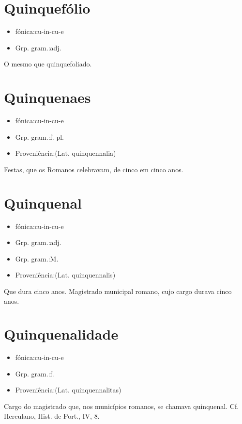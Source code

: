 \section{Quinquefólio}
\begin{itemize}
\item {fónica:cu-in-cu-e}
\end{itemize}
\begin{itemize}
\item {Grp. gram.:adj.}
\end{itemize}
O mesmo que \textunderscore quinquefoliado\textunderscore .
\section{Quinquenaes}
\begin{itemize}
\item {fónica:cu-in-cu-e}
\end{itemize}
\begin{itemize}
\item {Grp. gram.:f. pl.}
\end{itemize}
\begin{itemize}
\item {Proveniência:(Lat. \textunderscore quinquennalia\textunderscore )}
\end{itemize}
Festas, que os Romanos celebravam, de cinco em cinco anos.
\section{Quinquenal}
\begin{itemize}
\item {fónica:cu-in-cu-e}
\end{itemize}
\begin{itemize}
\item {Grp. gram.:adj.}
\end{itemize}
\begin{itemize}
\item {Grp. gram.:M.}
\end{itemize}
\begin{itemize}
\item {Proveniência:(Lat. \textunderscore quinquennalis\textunderscore )}
\end{itemize}
Que dura cinco anos.
Magistrado municipal romano, cujo cargo durava cinco anos.
\section{Quinquenalidade}
\begin{itemize}
\item {fónica:cu-in-cu-e}
\end{itemize}
\begin{itemize}
\item {Grp. gram.:f.}
\end{itemize}
\begin{itemize}
\item {Proveniência:(Lat. \textunderscore quinquennalitas\textunderscore )}
\end{itemize}
Cargo do magistrado que, nos municípios romanos, se chamava quinquenal. Cf. Herculano, \textunderscore Hist. de Port.\textunderscore , IV, 8.
